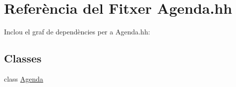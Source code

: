 \hypertarget{_agenda_8hh}{\section{Referència del Fitxer Agenda.\-hh}
\label{_agenda_8hh}
}
Inclou el graf de dependències per a Agenda.\-hh\-:
\subsection*{Classes}
\begin{DoxyCompactItemize}
\item 
class \hyperlink{class_agenda}{Agenda}
\end{DoxyCompactItemize}
